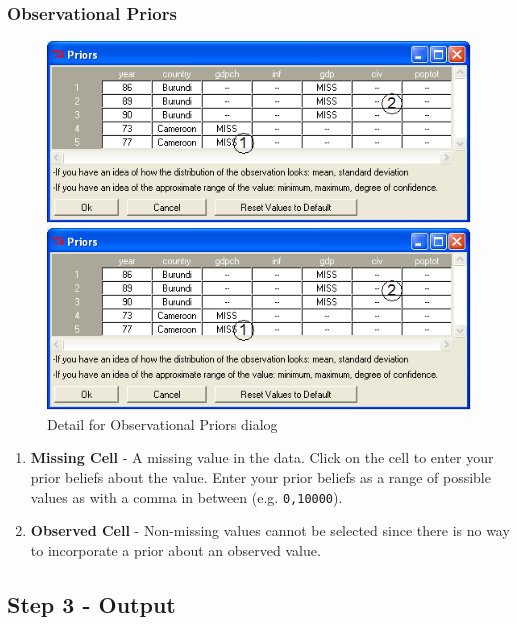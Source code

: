 \documentclass[12pt,titlepage]{article}
\begin{document}
\subsubsection{Observational Priors}
\label{sec:refobspri}
\begin{figure}[h]
 \begin{htmlonly} 
  \centering \includegraphics[scale=1]{obspri} 
 \end{htmlonly}
 \begin{latexonly}
  \centering \includegraphics[scale=.75]{obspri}
 \end{latexonly}
\caption{Detail for Observational Priors dialog}
\end{figure}
\begin{enumerate}
\item \textbf{Missing Cell} - A missing value in the data.  Click on
  the cell to enter your prior beliefs about the value.  Enter your
  prior beliefs as a range of possible values as with a comma in
  between (e.g. \texttt{0,10000}).
\item \textbf{Observed Cell} - Non-missing values cannot be selected
  since there is no way to incorporate a prior about an observed
  value.
\end{enumerate}

\subsection{Step 3 - Output}
\label{sec:step3}
\end{document}
